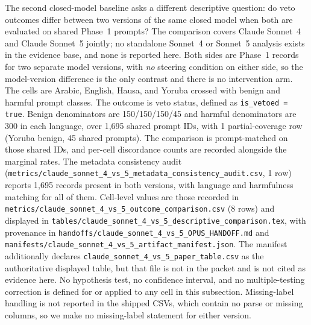 The second closed-model baseline asks a different descriptive question: do veto
outcomes differ between two versions of the same closed model when both are
evaluated on shared Phase~1 prompts? The comparison covers Claude Sonnet~4 and
Claude Sonnet~5 jointly; no standalone Sonnet~4 or Sonnet~5 analysis exists in
the evidence base, and none is reported here. Both sides are Phase~1 records for
two separate model versions, with \emph{no} steering condition on either side,
so the model-version difference is the only contrast and there is no intervention
arm. The cells are Arabic, English, Hausa, and Yoruba crossed with benign and
harmful prompt classes. The outcome is veto status, defined as
\texttt{is\_vetoed = true}. Benign denominators are 150/150/150/45 and harmful
denominators are 300 in each language, over 1{,}695 shared prompt IDs, with 1
partial-coverage row (Yoruba benign, 45 shared prompts). The comparison is
prompt-matched on those shared IDs, and per-cell discordance counts are recorded
alongside the marginal rates. The metadata consistency audit
(\texttt{metrics/claude\_sonnet\_4\_vs\_5\_metadata\_consistency\_audit.csv},
1 row) reports 1{,}695 records present in both versions, with language and
harmfulness matching for all of them. Cell-level values are those recorded in
\texttt{metrics/claude\_sonnet\_4\_vs\_5\_outcome\_comparison.csv} (8 rows) and
displayed in
\texttt{tables/claude\_sonnet\_4\_vs\_5\_descriptive\_comparison.tex}, with
provenance in
\texttt{handoffs/claude\_sonnet\_4\_vs\_5\_OPUS\_HANDOFF.md} and
\texttt{manifests/claude\_sonnet\_4\_vs\_5\_artifact\_manifest.json}. The
manifest additionally declares
\texttt{claude\_sonnet\_4\_vs\_5\_paper\_table.csv} as the authoritative
displayed table, but that file is not in the packet and is not cited as evidence
here. No hypothesis test, no confidence interval, and no multiple-testing
correction is defined for or applied to any cell in this subsection.
Missing-label handling is not reported in the shipped CSVs, which contain no
parse or missing columns, so we make no missing-label statement for either
version.

